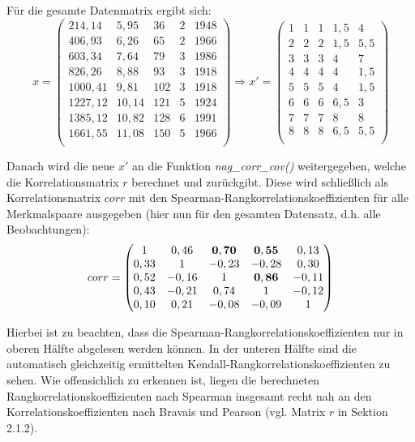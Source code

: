 \noindent Für die gesamte Datenmatrix ergibt sich:
\begin{equation*}
	x =
	\begin{pmatrix}
		214,14 & 5,95 & 36 & 2 & 1948\\
		406,93 & 6,26 & 65 & 2 & 1966\\
		603,34 & 7,64 & 79 & 3 & 1986\\
		826,26 & 8,88 & 93 & 3 & 1918\\
		1000,41 & 9,81 & 102 & 3 & 1918\\
		1227,12 & 10,14 & 121 & 5 & 1924\\
		1385,12 & 10,82 & 128 & 6 & 1991\\
		1661,55 & 11,08 & 150 & 5 & 1966\\
	\end{pmatrix}
	\Rightarrow
	x' =
	\begin{pmatrix}
		1 & 1 & 1 & 1,5 & 4\\
		2 & 2 & 2 & 1,5 & 5,5\\
		3 & 3 & 3 & 4 & 7\\
		4 & 4 & 4 & 4 & 1,5\\
		5 & 5 & 5 & 4 & 1,5\\
		6 & 6 & 6 & 6,5 & 3\\
		7 & 7 & 7 & 8 & 8\\
		8 & 8 & 8 & 6,5 & 5,5\\
	\end{pmatrix}
\end{equation*}

\noindent Danach wird die neue $x'$ an die Funktion {\it nag\_corr\_cov()} weitergegeben, welche die Korrelationsmatrix $r$ berechnet und zurückgibt. Diese wird schließlich als Korrelationsmatrix $corr$ mit den Spearman-Rangkorrelationskoeffizienten für alle Merkmalspaare ausgegeben (hier nun für den gesamten Datensatz, d.h. alle Beobachtungen):
\begin{equation*}
	corr =
	\begin{pmatrix}
		1 & 0,46 & {\bf 0,70} & {\bf 0,55} & 0,13\\
		0,33 & 1 & -0,23 & -0,28 & 0,30\\
		0,52 & -0,16 & 1 & {\bf 0,86} & -0,11\\
		0,43 & -0,21 & 0,74 & 1 & -0,12\\
		0,10 & 0,21 & -0,08 & -0,09 & 1\\
	\end{pmatrix}
\end{equation*}

\noindent Hierbei ist zu beachten, dass die Spearman-Rangkorrelationskoeffizienten nur in oberen Hälfte abgelesen werden können. In der unteren Hälfte sind die automatisch gleichzeitig ermittelten Kendall-Rangkorrelationskoeffizienten zu sehen. Wie offensichlich zu erkennen ist, liegen die berechneten Rangkorrelationskoeffizienten nach Spearman insgesamt recht nah an den Korrelationskoeffizienten nach Bravais und Pearson (vgl. Matrix $r$ in Sektion 2.1.2).

